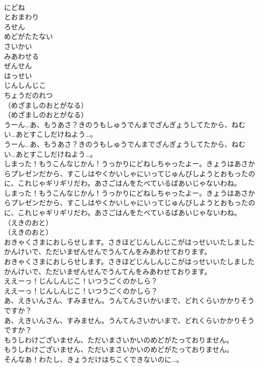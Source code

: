 \documentclass[8pt]{extreport}
\begin{document}
\begin{CJK}{UTF8}{min}
\\	にどね
\\	とおまわり
\\	ろせん
\\	めどがたたない
\\	さいかい
\\	みあわせる
\\	ぜんせん
\\	はっせい
\\	じんしんじこ
\\	ちょうだのれつ
\\	（めざましのおとがなる）
\\	（めざましのおとがなる）
\\	うーん…あ、もうあさ？きのうもしゅうでんまでざんぎょうしてたから、ねむい…あとすこしだけねよう…。
\\	うーん…あ、もうあさ？きのうもしゅうでんまでざんぎょうしてたから、ねむい…あとすこしだけねよう…。
\\	しまった！もうこんなじかん！うっかりにどねしちゃったよー。きょうはあさからプレゼンだから、すこしはやくかいしゃにいってじゅんびしようとおもったのに、これじゃギリギリだわ。あさごはんをたべているばあいじゃないわね。
\\	しまった！もうこんなじかん！うっかりにどねしちゃったよー。きょうはあさからプレゼンだから、すこしはやくかいしゃにいってじゅんびしようとおもったのに、これじゃギリギリだわ。あさごはんをたべているばあいじゃないわね。
\\	（えきのおと）
\\	（えきのおと）
\\	おきゃくさまにおしらせします。さきほどじんしんじこがはっせいいたしましたかんけいで、ただいまぜんせんでうんてんをみあわせております。
\\	おきゃくさまにおしらせします。さきほどじんしんじこがはっせいいたしましたかんけいで、ただいまぜんせんでうんてんをみあわせております。
\\	ええーっ！じんしんじこ！いつうごくのかしら？
\\	ええーっ！じんしんじこ！いつうごくのかしら？
\\	あ、えきいんさん、すみません。うんてんさいかいまで、どれくらいかかりそうですか？
\\	あ、えきいんさん、すみません。うんてんさいかいまで、どれくらいかかりそうですか？
\\	もうしわけございません、ただいまさいかいのめどがたっておりません。
\\	もうしわけございません、ただいまさいかいのめどがたっておりません。
\\	そんなあ！わたし、きょうだけはちこくできないのに…。

\end{CJK}
\end{document}
